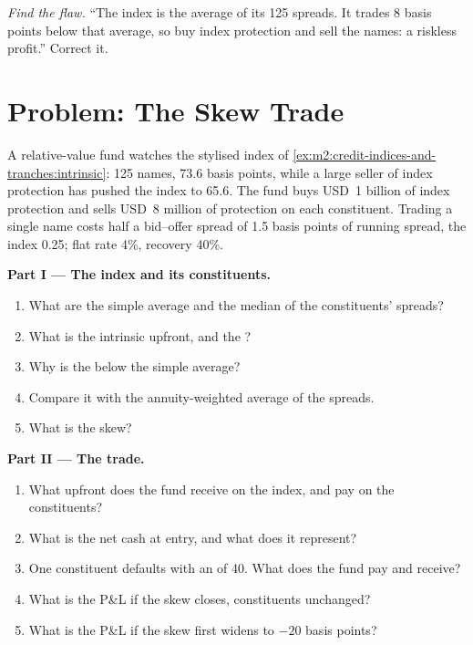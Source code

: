 \begin{exercise}[$\star\star\star$]\label{exo:m2:credit-indices-and-tranches:8}
\emph{Find the flaw.} ``The index is the average of its 125 spreads. It trades 8 basis
points below that average, so buy index protection and sell the names: a riskless
profit.'' Correct it.
\end{exercise}

\section{Problem: The Skew Trade}

\begin{problem}\label{pb:m2:credit-indices-and-tranches:1}
A relative-value fund watches the stylised index of
\cref{ex:m2:credit-indices-and-tranches:intrinsic}: 125 names,  73.6
basis points, while a large seller of index protection has pushed the index to 65.6.
The fund buys USD~1 billion of index protection and sells USD~8 million of protection
on each constituent. Trading a single name costs half a bid--offer spread of 1.5 basis
points of running spread, the index 0.25; flat rate 4\%, recovery 40\%.

\medskip\noindent\textbf{Part I --- The index and its constituents.}
\begin{enumerate}
\item What are the simple average and the median of the constituents' spreads?
\item What is the intrinsic upfront, and the ?
\item Why is the  below the simple average?
\item Compare it with the annuity-weighted average of the spreads.
\item What is the skew?
\end{enumerate}

\medskip\noindent\textbf{Part II --- The trade.}
\begin{enumerate}[resume]
\item What upfront does the fund receive on the index, and pay on the constituents?
\item What is the net cash at entry, and what does it represent?
\item One constituent defaults with an  of 40. What does the fund pay
and receive?
\item What is the P\&L if the skew closes, constituents unchanged?
\item What is the P\&L if the skew first widens to $-20$ basis points?
\end{enumerate}


\end{problem}
